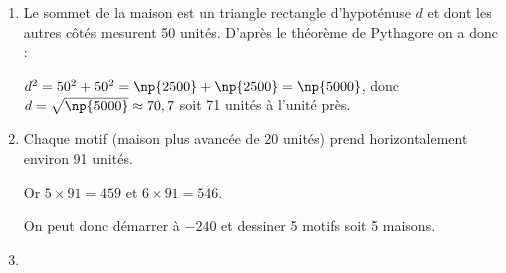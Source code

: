 \begin{enumerate}
\item  %
Le sommet de la maison est un triangle rectangle d'hypoténuse $d$ et dont les autres côtés mesurent 50 unités. D'après le théorème de Pythagore on a donc :

$d^2 = 50^2 + 50^2 = \np{2500} + \np{2500} = \np{5000}$, donc $d = \sqrt{\np{5000}} \approx 70,7$ soit 71 unités à l'unité près. 

\item  %

Chaque motif (maison plus avancée de 20 unités) prend horizontalement environ 91 unités.

Or $5 \times 91 = 459$ et $6 \times 91 = 546$.

On peut donc démarrer à $- 240$ et dessiner 5 motifs soit 5 maisons.
%


\item %


\end{enumerate}

